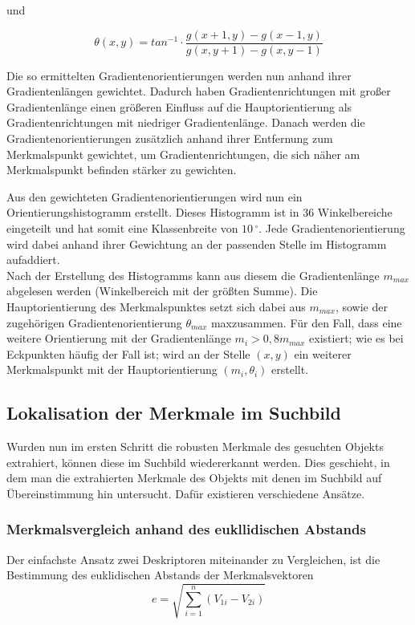 und

\begin{equation*}
\theta (x, y) = tan^{-1}\cdot \frac{g(x +1, y) - g(x-1, y)}{g(x, y +1) - g(x, y-1)}
\end{equation*}

Die so ermittelten Gradientenorientierungen werden nun anhand ihrer Gradientenlängen gewichtet. Dadurch haben Gradientenrichtungen mit großer Gradientenlänge einen größeren Einfluss auf die Hauptorientierung als Gradientenrichtungen mit niedriger Gradientenlänge.
Danach werden die Gradientenorientierungen zusätzlich anhand ihrer Entfernung zum Merkmalspunkt gewichtet, um Gradientenrichtungen, die sich näher am Merkmalspunkt befinden stärker zu gewichten.

Aus den gewichteten Gradientenorientierungen wird nun ein Orientierungshistogramm erstellt. Dieses Histogramm ist in 36 Winkelbereiche eingeteilt und hat somit eine Klassenbreite von $10\,^{\circ}$.
Jede Gradientenorientierung wird dabei anhand ihrer Gewichtung an der passenden Stelle im Histogramm aufaddiert. \\
Nach der Erstellung des Histogramms kann aus diesem die Gradientenlänge $m_{max}$ abgelesen werden (Winkelbereich mit der größten Summe). Die Hauptorientierung des Merkmalspunktes  setzt sich dabei aus $m_{max}$, sowie der zugehörigen Gradientenorientierung $\theta_{max}$ maxzusammen.
Für den Fall, dass eine weitere Orientierung mit der Gradientenlänge $m_i > 0,8 m_{max}$
existiert; wie es bei Eckpunkten häufig der Fall ist; wird an der Stelle $(x, y)$ ein weiterer Merkmalspunkt mit der Hauptorientierung $(m_i, \theta_i)$ erstellt.
\subsection{Lokalisation der Merkmale im Suchbild}
Wurden nun im ersten Schritt die robusten Merkmale des gesuchten Objekts extrahiert, können diese im Suchbild wiedererkannt werden.
Dies geschieht, in dem man die extrahierten Merkmale des Objekts mit denen im Suchbild auf Übereinstimmung hin untersucht.
Dafür existieren verschiedene Ansätze.
	\subsubsection{Merkmalsvergleich anhand des eukllidischen Abstands}
Der einfachste Ansatz zwei Deskriptoren miteinander zu Vergleichen, ist die Bestimmung des euklidischen Abstands der Merkmalsvektoren
\begin{equation*}
e = \sqrt{\sum_{i = 1}^{n}(V_{1i} - V_{2i})}
\end{equation*}

